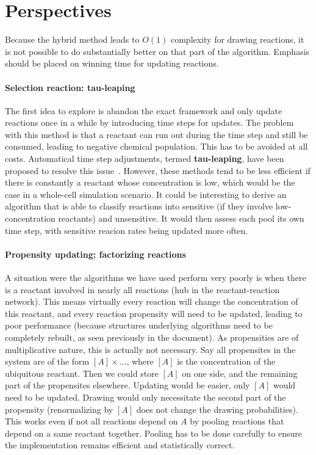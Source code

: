 \section {Perspectives}

Because the hybrid method leads to $O(1)$ complexity for drawing reactions, it is not possible to do substantially better on that part of the algorithm. Emphasis should be placed on winning time for updating reactions.

\paragraph{Selection reaction: tau-leaping} The first idea to explore is abandon the exact framework and only update reactions once in a while by introducing time steps for updates. The problem with this method is that a reactant can run out during the time step and still be consumed, leading to negative chemical population. This has to be avoided at all costs. Automatical time step adjustments, termed \textbf{tau-leaping}, have been proposed to resolve this issue~\citep{cao_avoiding_2005}. However, these methods tend to be less efficient if there is constantly a reactant whose concentration is low, which would be the case in a whole-cell simulation scenario. It could be interesting to derive an algorithm that is able to classify reactions into sensitive (if they involve low-concentration reactants) and unsensitive. It would then assess each pool its own time step, with sensitive reacion rates being updated more often.

\paragraph{Propensity updating: factorizing reactions} A situation were the algorithms we have used perform very poorly is when there is a reactant involved in nearly all reactions (hub in the reactant-reaction network). This means virtually every reaction will change the concentration of this reactant, and every reaction propensity will need to be updated, leading to poor performance (because structures underlying algorithms need to be completely rebuilt, as seen previously in the document). As propensities are of multiplicative nature, this is actually not necessary. Say all propensites in the system are of the form $[A]\times ...$, where $[A]$ is the concentration of the ubiquitous reactant. Then we could store $[A]$ on one side, and the remaining part of the propensites elsewhere. Updating would be easier, only $[A]$ would need to be updated. Drawing would only necessitate the second part of the propensity (renormalizing by $[A]$ does not change the drawing probabilities). This works even if not all reactions depend on $A$ by pooling reactions that depend on a same reactant together. Pooling has to be done carefully to ensure the implementation remains efficient and statistically correct.

